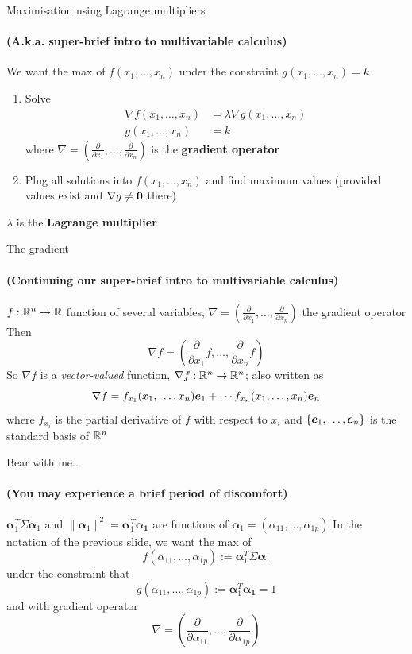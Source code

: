 \documentclass[aspectratio=169]{beamer}\usepackage[]{graphicx}\usepackage[]{xcolor}
\begin{document}
\begin{frame}{Maximisation using Lagrange multipliers}
\framesubtitle{(A.k.a. super-brief intro to multivariable calculus)}
We want the max of $f(x_1,\ldots,x_n)$ under the constraint $g(x_1,\ldots,x_n)=k$
\begin{enumerate}
\item Solve
\begin{align*}
\nabla f(x_1,\ldots,x_n) &= \lambda\nabla g(x_1,\ldots,x_n) \\
g(x_1,\ldots,x_n) &= k
\end{align*}
where $\nabla=(\frac{\partial}{\partial x_1},\ldots,\frac{\partial}{\partial x_n})$ is the \textbf{gradient operator}
\item Plug all solutions into $f(x_1,\ldots,x_n)$ and find maximum values (provided values exist and $\nabla g\neq \b0$ there)
\end{enumerate}
\vfill
$\lambda$ is the \textbf{Lagrange multiplier}
\end{frame}


\begin{frame}{The gradient}
\framesubtitle{(Continuing our super-brief intro to multivariable calculus)}
$f:\mathbb{R}^n\to\mathbb{R}$ function of several variables, $\nabla=\left(\frac{\partial}{\partial x_1},\ldots,\frac{\partial}{\partial x_n}\right)$ the gradient operator
\vfill
Then
\[
\nabla f = \left(
\frac{\partial}{\partial x_1}f,\ldots,
\frac{\partial}{\partial x_n}f
\right)
\]
\vfill
So $\nabla f$ is a \emph{vector-valued} function, $\nabla f:\mathbb{R}^n\to\mathbb{R}^n$; also written as
\[
\nabla f = f_{x_1}(x_1,\ldots,x_n)\bm{e}_1+\cdots f_{x_n}(x_1,\ldots,x_n)\bm{e}_n
\]
where $f_{x_i}$ is the partial derivative of $f$ with respect to $x_i$ and $\{\bm{e}_1,\ldots,\bm{e}_n\}$ is the standard basis of $\mathbb{R}^n$
\end{frame}


\begin{frame}{Bear with me..}
\framesubtitle{(You may experience a brief period of discomfort)}
$\bm{\alpha}_1^T\Sigma\bm{\alpha}_1$ and $\|\bm{\alpha}_1\|^2=\bm{\alpha}_1^T\bm{\alpha_1}$ are functions of $\bm{\alpha}_1=(\alpha_{11},\ldots,\alpha_{1p})$
\vfill
In the notation of the previous slide, we want the max of 
\[
f(\alpha_{11},\ldots,\alpha_{1p}) := \bm{\alpha}_1^T\Sigma\bm{\alpha}_1
\]
under the constraint that
\[
g(\alpha_{11},\ldots,\alpha_{1p}) := \bm{\alpha}_1^T\bm{\alpha_1} = 1
\]
and with gradient operator
\[
\nabla = \left(
\frac{\partial}{\partial \alpha_{11}},
\ldots,
\frac{\partial}{\partial \alpha_{1p}}
\right)
\]
\end{frame}
\end{document}
